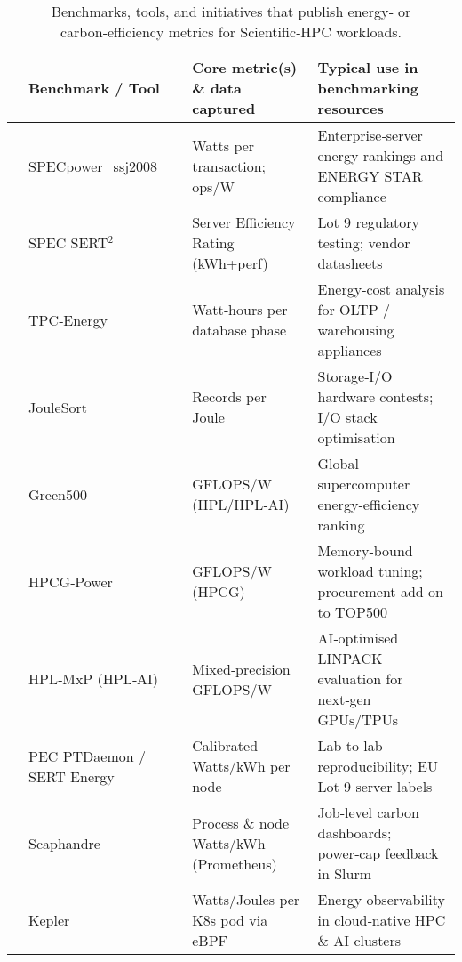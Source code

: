 \begin{table*}[!t]
  \centering
  \caption{Benchmarks, tools, and initiatives that publish energy‑ or carbon‑efficiency metrics for Scientific‑HPC workloads.}
  \label{tab:hpc_energy_catalog}
  
  
  
  \begin{tabularx}{0.9\textwidth}{|p{}p{}p{}XX|}
    \toprule
    &
     \headerfont\textbf{Benchmark / Tool} & 
     &
     \headerfont\textbf{Core metric(s) \& data captured} & \headerfont\textbf{Typical use in benchmarking resources} \\ 
    \midrule
    \hline
   & SPECpower\_ssj2008 & \cite{specpower}            & Watts per transaction; ops/W & Enterprise‑server energy rankings and ENERGY STAR compliance \\  
   & SPEC SERT$^{2}$  & \cite{sert2}                   & Server Efficiency Rating (kWh+perf)& Lot 9 regulatory testing; vendor datasheets \\  
   & TPC‑Energy  & \cite{tpcenergy}                    & Watt‑hours per database phase & Energy‑cost analysis for OLTP / warehousing appliances \\  
   & JouleSort  & \cite{joulesort}                     & Records per Joule & Storage‑I/O hardware contests; I/O stack optimisation \\  
   & Green500  & \cite{green500}                       & GFLOPS/W (HPL/HPL‑AI) & Global supercomputer energy‑efficiency ranking \\  
   & HPCG‑Power  & \cite{hpcgpower}                    & GFLOPS/W (HPCG) & Memory‑bound workload tuning; procurement add‑on to TOP500 \\  
   & HPL‑MxP (HPL‑AI)  & \cite{hplmxphplai}            & Mixed‑precision GFLOPS/W & AI‑optimised LINPACK evaluation for next‑gen GPUs/TPUs \\  
   & PEC PTDaemon / SERT Energy  & \cite{specptdaemonser} & Calibrated Watts/kWh per node & Lab‑to‑lab reproducibility; EU Lot 9 server labels \\  
   & Scaphandre  & \cite{scaphandre}                    & Process \& node Watts/kWh (Prometheus) & Job‑level carbon dashboards; power‑cap feedback in Slurm \\  
   & Kepler  & \cite{kepler}                            & Watts/Joules per K8s pod via eBPF & Energy observability in cloud‑native HPC \& AI clusters \\  

\end{tabularx}
\end{table*}
